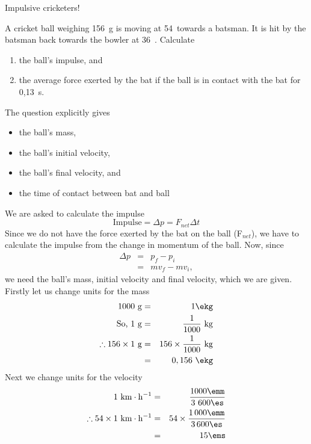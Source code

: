 \begin{wex}{Impulsive cricketers!}{A cricket ball weighing 156~g is moving at 54~\kph towards a batsman. It is hit by the batsman back towards the bowler at 36~\kph. Calculate
\begin{enumerate}
\item the ball's impulse, and
\item the average force exerted by the bat if the ball is in contact with the bat for 0,13~s.
\end{enumerate}}{
The question explicitly gives
\begin{itemize}
\item the ball's mass,
\item the ball's initial velocity,
\item the ball's final velocity, and
\item the time of contact between bat and ball
\end{itemize}

We are asked to calculate the impulse
\begin{equation*}
\mathrm{Impulse} = \Delta p = F_{net}\Delta t
\end{equation*}
Since we do not have the force exerted by the bat on the ball (F$_{net}$), we have to calculate the impulse from the change in momentum of the ball. Now, since
\begin{eqnarray*}
\Delta p &=& p_{f}-p_{i}\\
&=& mv_f - mv_i,
\end{eqnarray*}
we need the ball's mass, initial velocity and final velocity, which we are given.\\
Firstly let us change units for the mass
\begin{eqnarray*}
1000\ \mathrm{g} &=& 1\ekg\\
\mbox{So, }1\ \mathrm{g} &=& \frac{1}{1000}\ \mathrm{kg}\\
\therefore 156 \times 1\ \mathrm{g} &=& 156 \times \frac{1}{1000}\ \mathrm{kg}\\
&=& 0,156~\ekg
\end{eqnarray*}
Next we change units for the velocity
\begin{eqnarray*}
1\ \mathrm{km\cdot h^{-1}} &=& \frac{1000 \emm}{3\ 600\es}\\
\therefore 54 \times 1\ \mathrm{km\cdot h^{-1}} &=& 54 \times \frac{1\,000 \emm}{3\,600\es}\\
&=&15\ems
\end{eqnarray*}

}
\end{wex}
